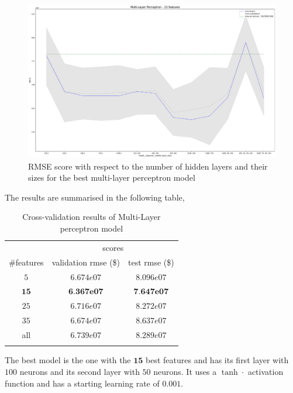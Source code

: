 \begin{figure}[H]
	\centering
	\includegraphics{figures/mlp_eval1.pdf}
	\caption{RMSE score with respect to the number of hidden layers and their sizes for the best multi-layer perceptron model}
	\label{fig:mlp_eval1}
\end{figure}

The results are summarised in the following table,
\begin{table}[H]
	\centering
	\begin{tabular}{ccc} \toprule
	  & \multicolumn {2}{c}{scores} \\\cmidrule(lr) {2-3}
	  \#features         & validation rmse (\$)             & test rmse (\$) \\\hline
	  $5$        		& $6.674e07$                      	& $8.096e07$ \\
	  $\textbf{15}$     & $\textbf{6.367e07}$               & $\textbf{7.647e07}$ \\
	  $25$        		& $6.716e07$                        & $8.272e07$ \\
	  $35$             	& $6.674e07$                        & $8.637e07$ \\
	  all             	& $6.739e07$                        & $8.289e07$ \\
	  \\\hline
	\end{tabular}
	\caption{Cross-validation results of Multi-Layer perceptron model}
	\label{tab:mlp-results}
\end{table}

The best model is the one with the $\textbf{15}$ best features and has its first layer with $100$ neurons and its second layer with $50$ neurons. It uses a $\tanh{\cdot}$ activation function and has a starting learning rate of $0.001$.

